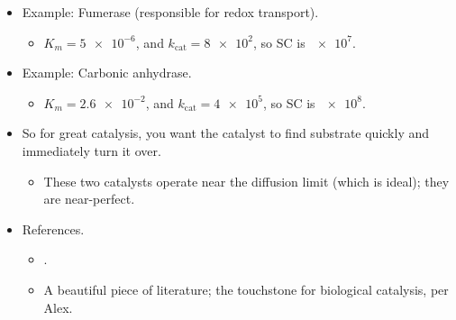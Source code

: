 \documentclass[../notes.tex]{subfiles}
\begin{document}
\begin{itemize}
    \item Example: Fumerase (responsible for redox transport).
    \begin{itemize}
        \item $K_m=\num{5e-6}$, and $k_\text{cat}=\num{8e2}$, so SC is $\num{e7}$.
    \end{itemize}
    \item Example: Carbonic anhydrase.
    \begin{itemize}
        \item $K_m=\num{2.6e-2}$, and $k_\text{cat}=\num{4e5}$, so SC is $\num{e8}$.
    \end{itemize}
    \item So for great catalysis, you want the catalyst to find substrate quickly and immediately turn it over.
    \begin{itemize}
        \item These two catalysts operate near the diffusion limit (which is ideal); they are near-perfect.
    \end{itemize}
    \item References.
    \begin{itemize}
        \item \textcite{bib:EnzymeCat}.
        \item A beautiful piece of literature; the touchstone for biological catalysis, per Alex.
    \end{itemize}
\end{itemize}
\end{document}
